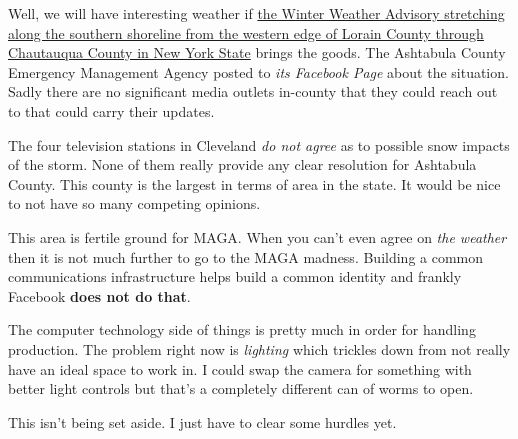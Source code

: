Well, we will have interesting weather if
\href{http://web.archive.org/web/20230113013428/https://forecast.weather.gov/showsigwx.php?warnzone=OHZ089&warncounty=OHC007&firewxzone=OHZ089&local_place1=Ashtabula\%20OH&product1=Winter+Weather+Advisory&lat=41.8681&lon=-80.7877\#.Y8C1Kv7P02w}{the
Winter Weather Advisory stretching along the southern shoreline from the
western edge of Lorain County through Chautauqua County in New York
State} brings the goods. The Ashtabula County Emergency Management
Agency posted to \emph{its Facebook Page} about the situation. Sadly
there are no significant media outlets in-county that they could reach
out to that could carry their updates.

The four television stations in Cleveland \emph{do not agree} as to
possible snow impacts of the storm. None of them really provide any
clear resolution for Ashtabula County. This county is the largest in
terms of area in the state. It would be nice to not have so many
competing opinions.

This area is fertile ground for MAGA. When you can't even agree on
\emph{the weather} then it is not much further to go to the MAGA
madness. Building a common communications infrastructure helps build a
common identity and frankly Facebook \textbf{does not do that}.

The computer technology side of things is pretty much in order for
handling production. The problem right now is \emph{lighting} which
trickles down from not really have an ideal space to work in. I could
swap the camera for something with better light controls but that's a
completely different can of worms to open.

This isn't being set aside. I just have to clear some hurdles yet.

